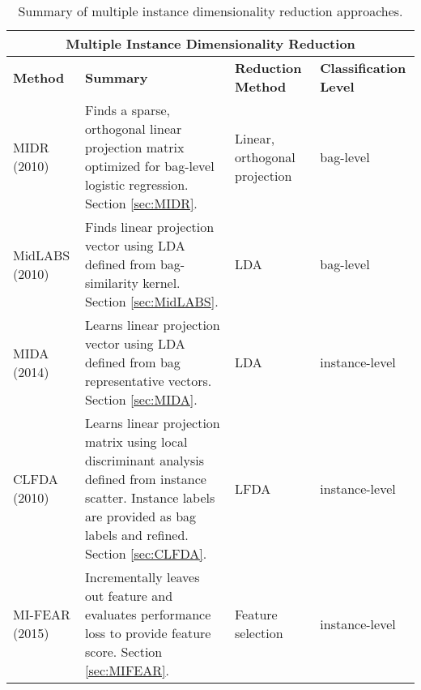 \begin{longtable}{ |p{2cm}|p{6cm}|p{2cm}|p{3cm}|  } 
	\caption{Summary of multiple instance dimensionality reduction approaches.}
	\label{tab:MIDRComparison}\\
	\hline
	\multicolumn{4}{|c|}{\textbf{Multiple Instance Dimensionality Reduction}} \\
	\hline
	\textbf{Method} & \textbf{Summary} & \textbf{Reduction Method} & \textbf{Classification Level}\\
	\hline
	MIDR  \newline (2010)  & Finds a sparse, orthogonal linear projection matrix optimized for bag-level logistic regression.  Section \ref{sec:MIDR}.   &Linear, orthogonal projection  &  bag-level\\
	\hline
	MidLABS \newline (2010) &  Finds linear projection vector using LDA defined from bag-similarity kernel. Section \ref{sec:MidLABS}.  & LDA   & bag-level\\
	\hline
	MIDA \newline (2014) &Learns linear projection vector using LDA defined from bag representative vectors. Section \ref{sec:MIDA}. & LDA &  instance-level\\
	\hline
	CLFDA \newline (2010)  &Learns linear projection matrix using local discriminant analysis defined from instance scatter.  Instance labels are provided as bag labels and refined. Section \ref{sec:CLFDA}. & LFDA &  instance-level\\
	\hline
	MI-FEAR \newline (2015) &  Incrementally leaves out feature and evaluates performance loss to provide feature score.  Section \ref{sec:MIFEAR}.  & Feature selection & instance-level\\
	\hline
\end{longtable}

